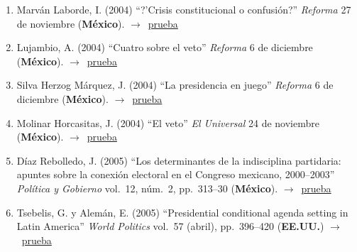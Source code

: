 \documentclass[12 pt, letter]{article}
\newenvironment{CitasMiTrabajo}{
    \begin{footnotesize}
    \begin{enumerate}[label={\footnotesize\emph{cita~\arabic*}},ref=\arabic*] %
        \setlength{\itemsep}{.1\itemsep}
        \setlength{\parskip}{.1\parskip}
    }{\end{enumerate}\end{footnotesize}}
\begin{document}

        \begin{CitasMiTrabajo}

        \item Marv\'an Laborde, I. (2004)
        ``?'Crisis constitucional o confusi\'on?'' \emph{Reforma} 27 de noviembre (\textbf{M\'exico}). $\rightarrow$~\href{https://github.com/emagar/cv/blob/master/citasMiTrab/magarWeldonVeto/marvan.pdf}{prueba}

        \item Lujambio, A. (2004) ``Cuatro sobre el veto''
        \emph{Reforma} 6 de diciembre (\textbf{M\'exico}). $\rightarrow$~\href{https://github.com/emagar/cv/blob/master/citasMiTrab/magarWeldonVeto/luj.pdf}{prueba}

        \item Silva Herzog M\'arquez, J. (2004) ``La presidencia en
        juego'' \emph{Reforma} 6 de diciembre (\textbf{M\'exico}). $\rightarrow$~\href{https://github.com/emagar/cv/blob/master/citasMiTrab/magarWeldonVeto/jshm.pdf}{prueba}

        \item Molinar Horcasitas, J. (2004)
        ``El veto'' \emph{El Universal} 24 de noviembre (\textbf{M\'exico}). $\rightarrow$~\href{https://github.com/emagar/cv/blob/master/citasMiTrab/magarWeldonVeto/moli.pdf}{prueba}

        \item D\'iaz Rebolledo, J. (2005)
        ``Los determinantes de la indisciplina partidaria: apuntes sobre la conexi\'on electoral en el Congreso mexicano, 2000--2003''
        \emph{Pol\'itica y Gobierno} vol.\ 12, n\'um.\ 2, pp.\ 313--30 (\textbf{M\'exico}). $\rightarrow$~\href{https://github.com/emagar/cv/blob/master/citasMiTrab/magarWeldonVeto/diazrebolledo2005pyg.pdf}{prueba}

        \item Tsebelis, G. y Alem\'an, E. (2005)
        ``Presidential conditional agenda setting in Latin America'' \emph{World Politics} vol.\ 57 (abril), pp.\ 396--420 (\textbf{EE.UU.}) $\rightarrow$~\href{https://github.com/emagar/cv/blob/master/citasMiTrab/magarWeldonVeto/tsebal.pdf}{prueba}


\end{CitasMiTrabajo}
\end{document}
